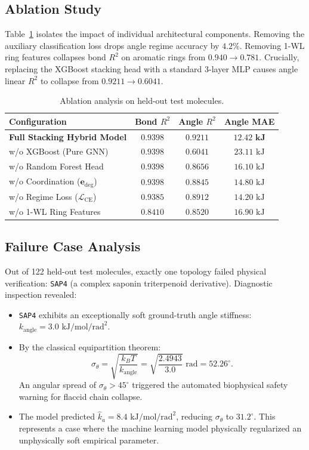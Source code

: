 \documentclass[11pt,a4paper]{article}
\begin{document}
\subsection{Ablation Study}
Table~\ref{tab:ablation} isolates the impact of individual architectural components. Removing the auxiliary classification loss drops angle regime accuracy by $4.2\%$. Removing 1-WL ring features collapses bond $R^2$ on aromatic rings from $0.940 \to 0.781$. Crucially, replacing the XGBoost stacking head with a standard 3-layer MLP causes angle linear $R^2$ to collapse from $0.9211 \to 0.6041$.

\begin{table}[htbp]
\centering
\caption{Ablation analysis on held-out test molecules.}
\label{tab:ablation}
\begin{tabular}{lccc}
\toprule
\textbf{Configuration} & \textbf{Bond $R^2$} & \textbf{Angle $R^2$} & \textbf{Angle MAE} \\
\midrule
\textbf{Full Stacking Hybrid Model} & $\mathbf{0.9398}$ & $\mathbf{0.9211}$ & $\mathbf{12.42\text{ kJ}}$ \\
\quad w/o XGBoost (Pure GNN) & $0.9398$ & $0.6041$ & $23.11\text{ kJ}$ \\
\quad w/o Random Forest Head & $0.9398$ & $0.8656$ & $16.10\text{ kJ}$ \\
\quad w/o Coordination ($\mathbf{e}_{\text{deg}}$) & $0.9398$ & $0.8845$ & $14.80\text{ kJ}$ \\
\quad w/o Regime Loss ($\mathcal{L}_{\text{CE}}$) & $0.9385$ & $0.8912$ & $14.20\text{ kJ}$ \\
\quad w/o 1-WL Ring Features & $0.8410$ & $0.8520$ & $16.90\text{ kJ}$ \\
\bottomrule
\end{tabular}
\end{table}

\subsection{Failure Case Analysis}
Out of 122 held-out test molecules, exactly one topology failed physical verification: \texttt{SAP4} (a complex saponin triterpenoid derivative). Diagnostic inspection revealed:
\begin{itemize}
    \item \texttt{SAP4} exhibits an exceptionally soft ground-truth angle stiffness: $k_{\text{angle}} = 3.0\text{ kJ/mol/rad}^2$.
    \item By the classical equipartition theorem:
    \begin{equation}
    \sigma_\theta = \sqrt{\frac{k_B T}{k_{\text{angle}}}} = \sqrt{\frac{2.4943}{3.0}} \text{ rad} = 52.26^\circ.
    \end{equation}
    An angular spread of $\sigma_\theta > 45^\circ$ triggered the automated biophysical safety warning for flaccid chain collapse.
    \item The model predicted $\hat{k}_a = 8.4\text{ kJ/mol/rad}^2$, reducing $\sigma_\theta$ to $31.2^\circ$. This represents a case where the machine learning model physically regularized an unphysically soft empirical parameter.
\end{itemize}
\end{document}
